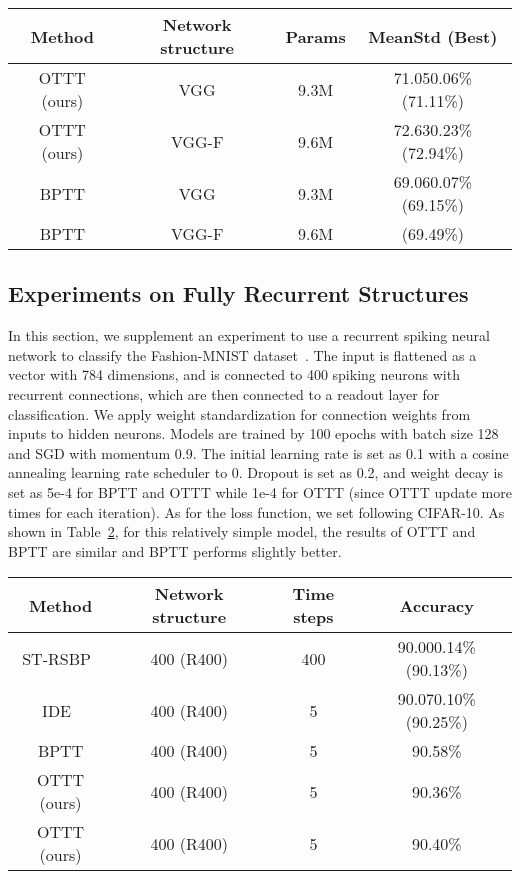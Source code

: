 \documentclass{article}
\begin{document}
\begin{table} [ht]
	\centering
	\small
	\tabcolsep=2mm
	\begin{tabular}{cccc}
		\toprule[1pt]
		Method & Network structure & Params & MeanStd (Best)\\
		\midrule[0.5pt]
		OTTT (ours) & VGG & 9.3M & 71.050.06\% (71.11\%)\\
		OTTT (ours) & VGG-F & 9.6M & 72.630.23\% (72.94\%)\\
		\hline
		BPTT & VGG & 9.3M & 69.060.07\% (69.15\%)\\
		BPTT & VGG-F & 9.6M & (69.49\%)\\
		\bottomrule[1pt]
	\end{tabular}
	\label{feedback ottt and bptt}
\end{table}


\subsection{Experiments on Fully Recurrent Structures}

In this section, we supplement an experiment to use a recurrent spiking neural network to classify the Fashion-MNIST dataset~\cite{xiao2017fashion}. The input is flattened as a vector with 784 dimensions, and is connected to 400 spiking neurons with recurrent connections, which are then connected to a readout layer for classification. We apply weight standardization for connection weights from inputs to hidden neurons. Models are trained by 100 epochs with batch size 128 and SGD with momentum 0.9. The initial learning rate is set as 0.1 with a cosine annealing learning rate scheduler to 0. Dropout is set as 0.2, and weight decay is set as 5e-4 for BPTT and OTTT while 1e-4 for OTTT (since OTTT update more times for each iteration). As for the loss function, we set  following CIFAR-10. As shown in Table~\ref{fashionmnist}, for this relatively simple model, the results of OTTT and BPTT are similar and BPTT performs slightly better.

\begin{table} [ht]
	\centering
	\small
	\tabcolsep=0.5mm
	\begin{tabular}{cccc}
		\toprule[1pt]
		Method & Network structure & Time steps & Accuracy\\
		\midrule[0.5pt]
		ST-RSBP~\cite{zhang2019spike} & 400 (R400) & 400 & 90.000.14\% (90.13\%)\\
		IDE~\cite{xiao2021training} & 400 (R400) & 5 & 90.070.10\% (90.25\%) \\
		\hline
		BPTT & 400 (R400) & 5 & 90.58\% \\
		OTTT (ours) & 400 (R400) & 5 & 90.36\%\\
		OTTT (ours) & 400 (R400) & 5 & 90.40\%\\
		\bottomrule[1pt]
	\end{tabular}
	\label{fashionmnist}
\end{table}
\end{document}
